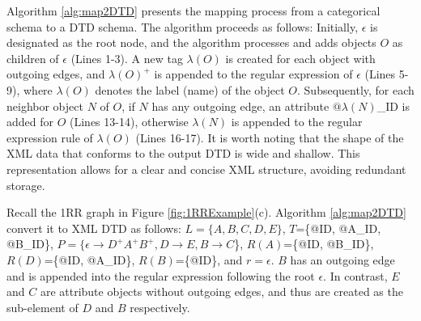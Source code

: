Algorithm \ref{alg:map2DTD} presents the mapping process from a categorical schema to a DTD schema. The algorithm proceeds as follows: Initially, $\epsilon$ is designated as the root node, and the algorithm processes and adds objects $O$ as children of $\epsilon$ (Lines 1-3).  A new tag $\lambda(O)$ is created for each object with outgoing edges, and $\lambda(O)^+$ is appended to the regular expression of $\epsilon$ (Lines 5-9), where $\lambda(O)$ denotes the label (name) of the object $O$. Subsequently, for each neighbor object $N$ of $O$, if $N$ has any outgoing edge, an attribute $@\lambda(N)$\_ID is added for $O$ (Lines 13-14), otherwise $\lambda(N)$ is appended to the regular expression rule of $\lambda(O)$ (Lines 16-17).  It is worth noting that the shape of the XML data that conforms to the output DTD is wide and shallow. This representation allows for a clear and concise XML structure, avoiding redundant storage.









\begin{example} Recall the 1RR graph in Figure \ref{fig:1RRExample}(c).   Algorithm \ref{alg:map2DTD} convert it to XML DTD as follows: $L=\{A,B,C,D,E\}$, $T$=\{@ID, @A\_ID, @B\_ID\}, $P=\{\epsilon \to D^+A^+B^+, D \to E,  B \to C$\}, $R(A)$=\{@ID, @B\_ID\}, $R(D)$=\{@ID, @A\_ID\}, $R(B)$=\{@ID\}, and $r = \epsilon$. $B$ has an outgoing edge and is appended into the regular expression following the root $\epsilon$. In contrast, $E$ and $C$ are attribute objects without outgoing edges, and thus are created as the sub-element of $D$ and $B$ respectively.  
\end{example}

